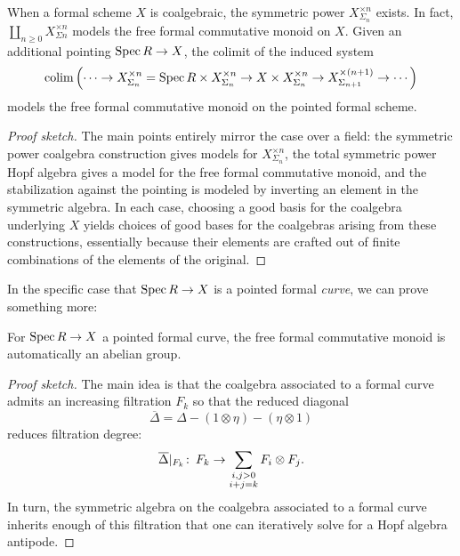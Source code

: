 \begin{corollary}\label{ProofOfFreeFormalMonoids}
When a formal scheme \(X\) is coalgebraic, the symmetric power \(X^{\times n}_{\Sigma_n}\) exists.  In fact, \(\coprod_{n \ge 0} X^{\times n}_{\Sigma n}\) models the free formal commutative monoid on \(X\).  Given an additional pointing \(\operatorname{Spec} R \to X\), the colimit of the induced system \[\operatorname*{colim} \left(\cdots \to X^{\times n}_{\Sigma_n} = \operatorname{Spec} R \times X^{\times n}_{\Sigma_n} \to X \times X^{\times n}_{\Sigma_n} \to X^{\times(n+1)}_{\Sigma_{n+1}} \to \cdots\right)\] models the free formal commutative monoid on the pointed formal scheme.
\end{corollary}
\begin{proof}[Proof sketch]
The main points entirely mirror the case over a field: the symmetric power coalgebra construction gives models for \(X^{\times n}_{\Sigma_n}\), the total symmetric power Hopf algebra gives a model for the free formal commutative monoid, and the stabilization against the pointing is modeled by inverting an element in the symmetric algebra.  In each case, choosing a good basis for the coalgebra underlying \(X\) yields choices of good bases for the coalgebras arising from these constructions, essentially because their elements are crafted out of finite combinations of the elements of the original.
\end{proof}

In the specific case that \(\operatorname{Spec} R \to X\) is a pointed formal \emph{curve}, we can prove something more:
\begin{corollary}\label{FreeFormalGroupOnACurve}
For \(\operatorname{Spec} R \to X\) a pointed formal curve, the free formal commutative monoid is automatically an abelian group.
\end{corollary}
\begin{proof}[Proof sketch]
The main idea is that the coalgebra associated to a formal curve admits an increasing filtration \(F_k\) so that the reduced diagonal \[\overline \Delta = \Delta - (1 \otimes \eta) - (\eta \otimes 1)\] reduces filtration degree: \[\overline \Delta|_{F_k}\colon\thinspace F_k \to \sum_{\substack{i,j > 0 \\ i+j=k}} F_i \otimes F_j.\]  In turn, the symmetric algebra on the coalgebra associated to a formal curve inherits enough of this filtration that one can iteratively solve for a Hopf algebra antipode.
\end{proof}

